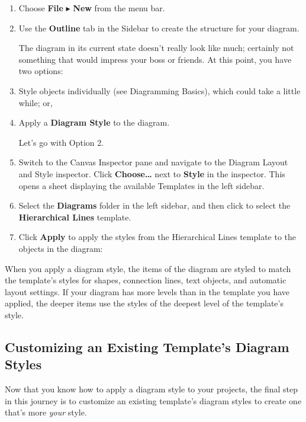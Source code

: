 \documentclass[../main.tex]{subfiles}
\begin{document}
\begin{enumerate}
  \item Choose \textbf{File} $\blacktriangleright$ \textbf{New} from the menu bar.
  \item Use the \textbf{Outline} tab in the Sidebar to create the structure for your diagram.


    The diagram in its current state doesn't really look like much; certainly not something that
    would impress your boss or friends. At this point, you have two options:
  \item Style objects individually (see Diagramming Basics), which could take a little while;
    or,
  \item Apply a \textbf{Diagram Style} to the diagram.

    Let's go with Option 2.
  \item Switch to the Canvas Inspector pane and navigate to the Diagram Layout and Style
    inspector. Click \textbf{Choose\ldots{}} next to \textbf{Style} in the inspector. This opens
    a sheet displaying the available Templates in the left sidebar.

  \item Select the \textbf{Diagrams} folder in the left sidebar, and then click to select the
    \textbf{Hierarchical Lines} template.

  \item Click \textbf{Apply} to apply the styles from the Hierarchical Lines template to the
    objects in the diagram:

\end{enumerate}

When you apply a diagram style, the items of the diagram are styled to match the template's
styles for shapes, connection lines, text objects, and automatic layout settings. If your
diagram has more levels than in the template you have applied, the deeper items use the styles
of the deepest level of the template's style.

\subsection{Customizing an Existing Template's Diagram Styles}

Now that you know how to apply a diagram style to your projects, the final step in this journey
is to customize an existing template's diagram styles to create one that's more \textit{your}
style.
\end{document}
